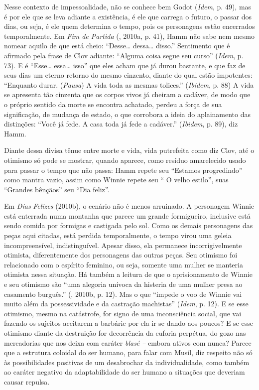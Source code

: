 Nesse contexto de impessoalidade, não se conhece bem Godot (\emph{Idem},
p. 49), mas é por ele que se leva adiante a existência, é ele que
carrega o futuro, o passar dos dias, ou seja, é ele quem determina o
tempo, pois os personagens estão encerrados temporalmente. Em \emph{Fim
de Partida} (, 2010a, p. 41), Hamm não sabe nem mesmo nomear
aquilo de que está cheio: ``Desse\ldots{} dessa\ldots{} disso.'' Sentimento que é
afirmado pela frase de Clov adiante: ``Alguma coisa segue seu curso''
(\emph{Idem}, p. 73). E é ``Esse\ldots{} essa\ldots{} isso'' que eles acham que já
durou bastante, e que faz de seus dias um eterno retorno do mesmo
cinzento, diante do qual estão impotentes: ``Enquanto durar.
(\emph{Pausa}) A vida toda as mesmas tolices.'' (\emph{Ibidem}, p. 88) A
vida se apresenta tão cinzenta que os corpos vivos já cheiram a cadáver,
de modo que o próprio sentido da morte se encontra achatado, perdeu a
força de sua significação, de mudança de estado, o que corrobora a ideia
do aplainamento das distinções: ``Você já fede. A casa toda já fede a
cadáver.'' (\emph{Ibidem}, p. 89), diz Hamm.

Diante dessa divisa tênue entre morte e vida, vida putrefeita como diz
Clov, até o otimismo só pode se mostrar, quando aparece, como resíduo
amarelecido usado para passar o tempo que não passa: Hamm repete seu
``Estamos progredindo'' como mantra vazio, assim como Winnie repete seu
`` O velho estilo'', suas ``Grandes bênçãos'' seu ``Dia feliz''.

Em \emph{Dias} \emph{Felizes} (2010b), o cenário não é menos arruinado.
A personagem Winnie está enterrada numa montanha que parece um grande
formigueiro, inclusive está sendo comida por formigas e castigada pelo
sol. Como os demais personagens das peças aqui citadas, está perdida
temporalmente, o tempo virou uma geleia incompreensível, indistinguível.
Apesar disso, ela permanece incorrigivelmente otimista, diferentemente
dos personagens das outras peças. Seu otimismo foi relacionado com o
espírito feminino, ou seja, somente uma mulher se manteria otimista
nessa situação. Há também a leitura de que o aprisionamento de Winnie e
seu otimismo são ``uma alegoria unívoca da histeria de uma mulher presa
ao casamento burguês.'' (, 2010b, p. 12). Mas o que ``impede o
voo de Winnie vai muito além da possessividade e da castração
machistas'' (\emph{Idem}, p. 12). E se esse otimismo, mesmo na
catástrofe, for signo de uma inconsciência social, que vai fazendo os
sujeitos aceitarem a barbárie por ela ir se dando aos poucos? E se esse
otimismo diante da destruição for decorrência da euforia perpétua, do
gozo nas mercadorias que nos deixa com caráter \emph{blasé --} embora
ativos com nunca? Parece que a estrutura coloidal do ser humano, para
falar com Musil, diz respeito não só às possibilidades positivas de um
desabrochar da individualidade, como também ao caráter negativo da
adaptabilidade do ser humano a situações que deveriam causar repulsa.

